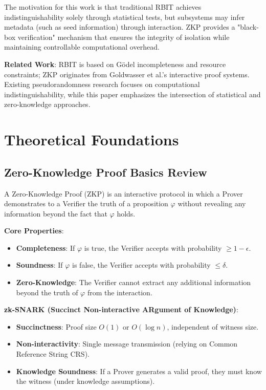 \documentclass[12pt]{article}
\theoremstyle{plain}
\theoremstyle{definition}
\begin{document}
The motivation for this work is that traditional RBIT achieves indistinguishability solely through statistical tests, but subsystems may infer metadata (such as seed information) through interaction. ZKP provides a "black-box verification" mechanism that ensures the integrity of isolation while maintaining controllable computational overhead.

\textbf{Related Work}: RBIT is based on G\"{o}del incompleteness and resource constraints\cite{godel1931}; ZKP originates from Goldwasser et al.'s interactive proof systems\cite{goldwasser1989}. Existing pseudorandomness research focuses on computational indistinguishability\cite{goldreich2001,vadhan2012}, while this paper emphasizes the intersection of statistical and zero-knowledge approaches.

\section{Theoretical Foundations}

\subsection{Zero-Knowledge Proof Basics Review}

A Zero-Knowledge Proof (ZKP) is an interactive protocol in which a Prover demonstrates to a Verifier the truth of a proposition $\varphi$ without revealing any information beyond the fact that $\varphi$ holds.

\textbf{Core Properties}:
\begin{itemize}
\item \textbf{Completeness}: If $\varphi$ is true, the Verifier accepts with probability $\ge 1 - \epsilon$.
\item \textbf{Soundness}: If $\varphi$ is false, the Verifier accepts with probability $\le \delta$.
\item \textbf{Zero-Knowledge}: The Verifier cannot extract any additional information beyond the truth of $\varphi$ from the interaction.
\end{itemize}

\textbf{zk-SNARK (Succinct Non-interactive ARgument of Knowledge)}\cite{groth2016}:
\begin{itemize}
\item \textbf{Succinctness}: Proof size $O(1)$ or $O(\log n)$, independent of witness size.
\item \textbf{Non-interactivity}: Single message transmission (relying on Common Reference String CRS).
\item \textbf{Knowledge Soundness}: If a Prover generates a valid proof, they must know the witness (under knowledge assumptions).
\end{itemize}
\end{document}
